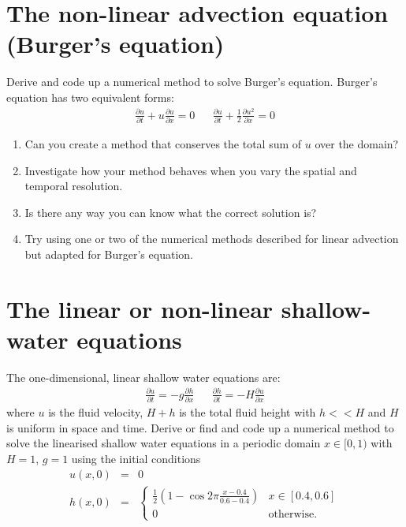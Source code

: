 \section{The non-linear advection equation (Burger's equation)\protect\label{sec:solveBurger}}

Derive and code up a numerical method to solve Burger's equation.
Burger's equation has two equivalent forms:
\begin{eqnarray*}
\frac{\partial u}{\partial t}+u\frac{\partial u}{\partial x}=0 &  & \frac{\partial u}{\partial t}+\frac{1}{2}\frac{\partial u^{2}}{\partial x}=0
\end{eqnarray*}

\begin{enumerate}
\item Can you create a method that conserves the total sum of $u$ over
the domain?
\item Investigate how your method behaves when you vary the spatial and
temporal resolution.
\item Is there any way you can know what the correct solution is?
\item Try using one or two of the numerical methods described for linear
advection but adapted for Burger's equation.
\end{enumerate}
\clearpage{}

\section{The linear or non-linear shallow-water equations \protect\label{sec:solveSWE}}

The one-dimensional, linear shallow water equations are:
\begin{eqnarray*}
\frac{\partial u}{\partial t}=-g\frac{\partial h}{\partial x} &  & \frac{\partial h}{\partial t}=-H\frac{\partial u}{\partial x}
\end{eqnarray*}
where $u$ is the fluid velocity, $H+h$ is the total fluid height
with $h<<H$ and $H$ is uniform in space and time. Derive or find
and code up a numerical method to solve the linearised shallow water
equations in a periodic domain $x\in[0,1)$ with $H=1$, $g=1$ using
the initial conditions 
\begin{eqnarray*}
u\left(x,0\right) & = & 0\\
h\left(x,0\right) & = & \begin{cases}
\frac{1}{2}\left(1-\cos2\pi\frac{x-0.4}{0.6-0.4}\right) & x\in\left[0.4,0.6\right]\\
0 & \text{otherwise}.
\end{cases}
\end{eqnarray*}


